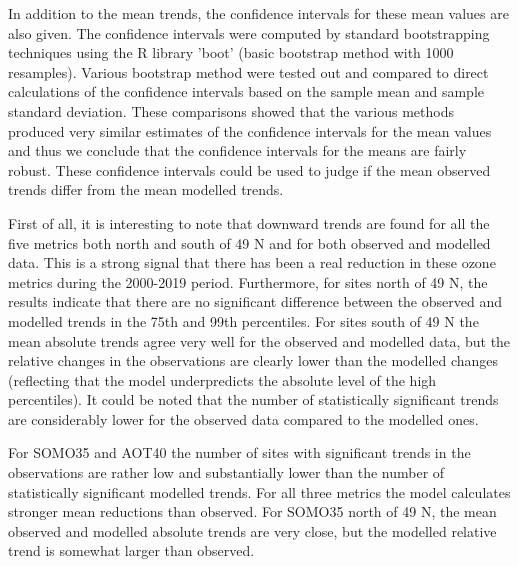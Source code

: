 In addition to the mean trends, the confidence intervals for these mean values are also given. The confidence intervals were computed by standard bootstrapping techniques \citep{DavisonHinkley:1997} using the R library 'boot' (basic bootstrap method with 1000 resamples). Various bootstrap method were tested out and compared to direct calculations of the confidence intervals based on the sample mean and sample standard deviation. These comparisons showed that the various methods produced very similar estimates of the confidence intervals for the mean values and thus we conclude that the confidence intervals for the means are fairly robust. These confidence intervals could be used to judge if the mean observed trends differ from the mean modelled trends.



First of all, it is interesting to note that downward trends are found for all the five metrics both north and south of 49 \degrees N and for both observed and modelled data. This is a strong signal that there has been a real reduction in these ozone metrics during the 2000-2019 period. Furthermore, for sites north of 49 \degrees N, the results indicate that there are no significant difference between the observed and modelled trends in the 75th and 99th percentiles. For sites south of 49 \degrees N the mean absolute trends agree very well for the observed and modelled data, but the relative changes in the observations are clearly lower than the modelled changes (reflecting that the model underpredicts the absolute level of the high percentiles). It could be noted that the number of statistically significant trends are considerably lower for the observed data compared to the modelled ones. 

For SOMO35 and AOT40 the number of sites with significant trends in the observations are rather low and substantially lower than the number of statistically significant modelled trends. For all three metrics the model calculates stronger mean reductions than observed. For SOMO35 north of 49 \degrees N, the mean observed and modelled absolute trends are very close, but the modelled relative trend is somewhat larger than observed.




